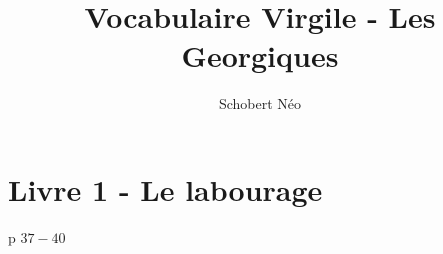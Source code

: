 \documentclass[a4paper, 11pt, hidelinks]{article}
\begin{document}
\newcommand{\grad}[1]{\vv{grad}#1}


\title{Vocabulaire Virgile - Les Georgiques}
\author{Schobert Néo}

\maketitle

\tableofcontents


\newpage

\listoffigures

\newpage



\section{Livre 1 - Le labourage}

p $37 - 40$
\end{document}

